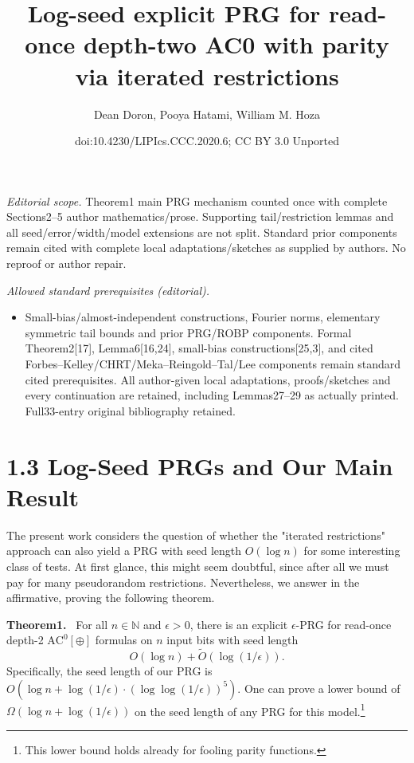 \documentclass[10pt,a4paper]{article}
\title{Log-seed explicit PRG for read-once depth-two AC0 with parity via iterated restrictions}
\author{Dean Doron, Pooya Hatami, William M. Hoza}
\date{doi:10.4230/LIPIcs.CCC.2020.6; CC BY 3.0 Unported}
\newenvironment{authorclaim}[1]{\par\medskip\noindent\textbf{#1.}\ \ignorespaces}{\par\medskip}
\begin{document}
\maketitle
\noindent\textit{Editorial scope.} Theorem1 main PRG mechanism counted once with complete Sections2–5 author mathematics/prose. Supporting tail/restriction lemmas and all seed/error/width/model extensions are not split. Standard prior components remain cited with complete local adaptations/sketches as supplied by authors. No reproof or author repair.\par\medskip
\noindent\textit{Allowed standard prerequisites (editorial).}\begin{itemize}
\item Small-bias/almost-independent constructions, Fourier norms, elementary symmetric tail bounds and prior PRG/ROBP components. Formal Theorem2[17], Lemma6[16,24], small-bias constructions[25,3], and cited Forbes–Kelley/CHRT/Meka–Reingold–Tal/Lee components remain standard cited prerequisites. All author-given local adaptations, proofs/sketches and every continuation are retained, including Lemmas27–29 as actually printed. Full33-entry original bibliography retained.
\end{itemize}\medskip
\section*{1.3 Log-Seed PRGs and Our Main Result}
The present work considers the question of whether the "iterated restrictions" approach can also yield a PRG with seed length $O(\log n)$ for some interesting class of tests. At first glance, this might seem doubtful, since after all we must pay for many pseudorandom restrictions. Nevertheless, we answer in the affirmative, proving the following theorem.
\begin{authorclaim}{Theorem1}
For all $n\in\mathbb N$ and $\epsilon>0$, there is an explicit $\epsilon$-PRG for read-once depth-2 $\mathrm{AC}^0[\oplus]$ formulas on $n$ input bits with seed length
\[
O(\log n)+\widetilde O(\log(1/\epsilon)).
\]
Specifically, the seed length of our PRG is $O(\log n+\log(1/\epsilon)\cdot(\log\log(1/\epsilon))^5)$. One can prove a lower bound of $\Omega(\log n+\log(1/\epsilon))$ on the seed length of any PRG for this model.\footnote{This lower bound holds already for fooling parity functions.}
\end{authorclaim}
\end{document}

